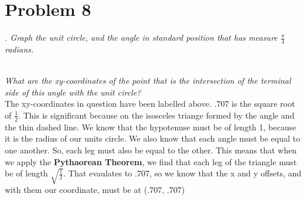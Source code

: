 \documentclass[11pt]{article} %
\newcommand\tab[1][1cm]{\hspace*{#1}}
\begin{document}
\section{Problem 8}
\textit{. Graph the unit circle, and the angle in standard position that has measure $\frac{\pi}{4}$ radians.}
\\
\textit{What are the xy-coordinates of the point that is the intersection of the terminal side of this angle with the unit circle?}\\
\tab The xy-coordinates in question have been labelled above. .707 is the square root of $\frac{1}{2}$. This is significant because on the isosceles triange formed by the angle and the thin dashed line. We know that the hypotenuse must be of length 1, because it is the radius of our units circle. We also know that each angle must be equal to one another. So, each leg must also be equal to the other. This means that when we apply the \textbf{Pythaorean Theorem}, we find that each leg of the triangle must be of length $\sqrt{\frac{1}{2}}$.  That evaulates to .707, so we know that the x and y offsets, and with them our coordinate, must be at (.707, .707)
\end{document}
